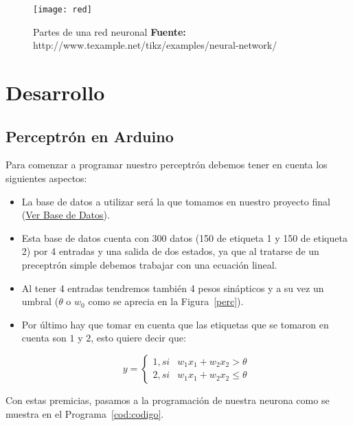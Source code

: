 \documentclass[10pt,a4paper]{article}
\begin{document}
\begin{figure}[H]
\centering
\texttt{[image: red]}
\caption{Partes de una red neuronal {\scriptsize \textbf{Fuente: }http://www.texample.net/tikz/examples/neural-network/}}
\label{red}
\end{figure}





\section{Desarrollo}
\subsection{Perceptrón en Arduino}
Para comenzar a programar nuestro perceptrón debemos tener en cuenta los siguientes aspectos:
\begin{itemize}
\item La base de datos a utilizar será la que tomamos en nuestro proyecto final (\href{https://github.com/JampyVi98/Sistemas-Embebidos/tree/master/Examen_Perceptron}{Ver Base de Datos}).
\item Esta base de datos cuenta con 300 datos (150 de etiqueta 1 y 150 de etiqueta 2) por 4 entradas y una salida de dos estados, ya que al tratarse de un preceptrón simple debemos trabajar con una ecuación lineal.
\item Al tener 4 entradas tendremos también 4 pesos sinápticos y a su vez un umbral ($\theta$ o $w_0$ como se aprecia en la Figura~\ref{perc}).
\item Por último hay que tomar en cuenta que las etiquetas que se tomaron en cuenta son $1$ y $2$, esto quiere decir que:

\begin{equation}
y = \left\{\begin{matrix}
1, si & w_1x_1+w_2x_2 > \theta\\ 
2, si & w_1x_1+w_2x_2\leqslant \theta
\end{matrix}\right.
\end{equation}

\end{itemize}

Con estas premicias, pasamos a la programación de nuestra neurona como se muestra en el Programa~\ref{cod:codigo}.


\end{document}

